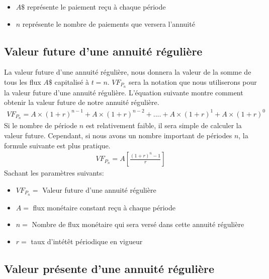\documentclass[letterpaper, 12pt]{article}
\newcommand{\1}{\mathds{1}}	%
\theoremstyle{definition}
\begin{document}
\begin{itemize}
\item $A\$$ représente le paiement reçu à chaque période 
\item $n$ représente le nombre de paiements que versera l'annuité
\end{itemize}

\subsection{Valeur future d'une annuité régulière}

La valeur future d'une annuité régulière, nous donnera la valeur de la somme de tous les flux $A\$$ capitalisé à $t=n$. $VF_{P_n}$ sera la notation que nous utiliserons pour la valeur future d'une annuité régulière. L'équation suivante montre comment obtenir la valeur future de notre annuité régulière.  
\begin{align*}
VF_{P_n} = A \times (1+r)^{n-1}+A \times (1+r)^{n-2}+....+A \times (1+r)^{1}+A \times (1+r)^{0}
\end{align*}
Si le nombre de période $n$ est relativement faible, il sera simple de calculer la valeur future. Cependant, si nous avons un nombre important de périodes $n$, la formule suivante est plus pratique. 
\begin{align*}
VF_{P_n}=A \left[\frac{(1+r)^n-1}{r} \right]
\end{align*}
Sachant les paramètres suivants: 
\begin{itemize}
\item $VF_{P_n}=$ Valeur future d'une annuité régulière 
\item $A=$ flux monétaire constant reçu à chaque période  
\item $n=$ Nombre de flux monétaire qui sera versé dans cette annuité régulière
\item $r=$ taux d'intétêt périodique en vigueur 
\end{itemize}


\subsection{Valeur présente d'une annuité régulière}
\end{document}
